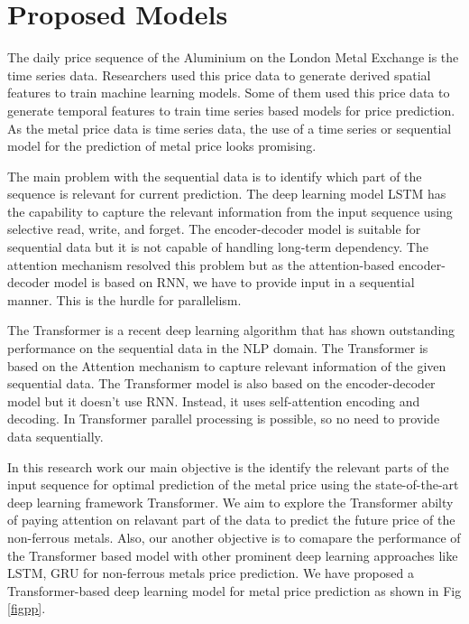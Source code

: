 \documentclass[preprint,12pt]{elsarticle}
\begin{document}
\section{Proposed Models}
The daily price sequence of the Aluminium on the London Metal Exchange is the time series data.  Researchers used this price data to generate derived spatial features to train machine learning models. Some of them used this price data to generate temporal features to train time series based models for price prediction. As the metal price data is time series data, the use of a time series or sequential model for the prediction of metal price looks promising. 
\par The main problem with the sequential data is to identify which part of the sequence is relevant for current prediction. The deep learning model LSTM has the capability to capture the relevant information from the input sequence using selective read, write, and forget. The encoder-decoder model is suitable for sequential data but it is not capable of handling long-term dependency. The attention mechanism resolved this problem but as the attention-based encoder-decoder model is based on RNN, we have to provide input in a sequential manner. This is the hurdle for parallelism. 
\par The Transformer is a recent deep learning algorithm that has shown outstanding performance on the sequential data in the NLP domain. The Transformer is based on the Attention mechanism to capture relevant information of the given sequential data. The Transformer model is also based on the encoder-decoder model but it doesn't use RNN. Instead, it uses self-attention encoding and decoding. In Transformer parallel processing is possible, so no need to provide data sequentially.
\par In this research work our main objective is the identify the relevant parts of the input sequence for optimal prediction of the metal price using the state-of-the-art deep learning framework Transformer. We aim to explore the Transformer abilty of paying attention on relavant part of the data to predict the future price of the non-ferrous metals. Also, our another objective is to comapare the performance of the Transformer based model with other prominent deep learning approaches like LSTM, GRU for non-ferrous metals price prediction. We have proposed a Transformer-based deep learning model for metal price prediction as shown in Fig \ref{figpp}. 
\end{document}
